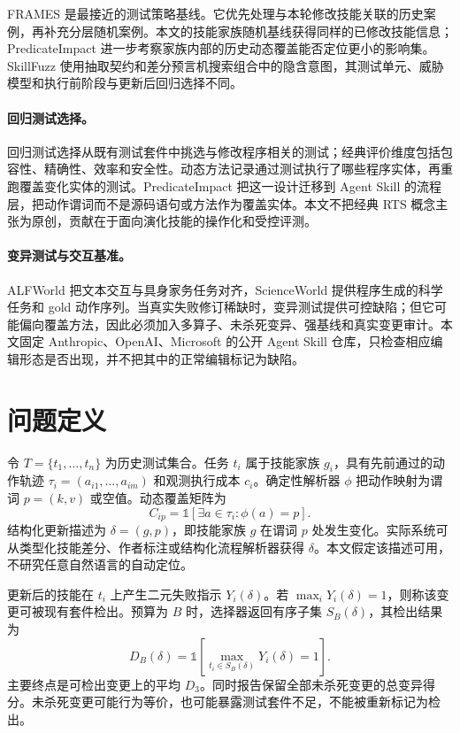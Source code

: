 \documentclass[10pt]{article}
\begin{document}
FRAMES 是最接近的测试策略基线。它优先处理与本轮修改技能关联的历史案例，再补充分层随机案例\citep{wang2026frames}。本文的技能家族随机基线获得同样的已修改技能信息；PredicateImpact 进一步考察家族内部的历史动态覆盖能否定位更小的影响集。SkillFuzz 使用抽取契约和差分预言机搜索组合中的隐含意图\citep{hu2026skillfuzz}，其测试单元、威胁模型和执行前阶段与更新后回归选择不同。

\paragraph{回归测试选择。}
回归测试选择从既有测试套件中挑选与修改程序相关的测试；经典评价维度包括包容性、精确性、效率和安全性\citep{rothermel1996rts}。动态方法记录通过测试执行了哪些程序实体，再重跑覆盖变化实体的测试。PredicateImpact 把这一设计迁移到 Agent Skill 的流程层，把动作谓词而不是源码语句或方法作为覆盖实体。本文不把经典 RTS 概念主张为原创，贡献在于面向演化技能的操作化和受控评测。

\paragraph{变异测试与交互基准。}
ALFWorld 把文本交互与具身家务任务对齐，ScienceWorld 提供程序生成的科学任务和 gold 动作序列\citep{shridhar2021alfworld,wang2022scienceworld}。当真实失败修订稀缺时，变异测试提供可控缺陷；但它可能偏向覆盖方法，因此必须加入多算子、未杀死变异、强基线和真实变更审计。本文固定 Anthropic、OpenAI、Microsoft 的公开 Agent Skill 仓库，只检查相应编辑形态是否出现\citep{anthropicskills2026,openaiskills2026,microsoftskills2026}，并不把其中的正常编辑标记为缺陷。

\section{问题定义}
令 $T=\{t_1,\ldots,t_n\}$ 为历史测试集合。任务 $t_i$ 属于技能家族 $g_i$，具有先前通过的动作轨迹 $\tau_i=(a_{i1},\ldots,a_{im})$ 和观测执行成本 $c_i$。确定性解析器 $\phi$ 把动作映射为谓词 $p=(k,v)$ 或空值。动态覆盖矩阵为
\begin{equation}
C_{ip}=\mathbb{1}\left[\exists a\in\tau_i:\phi(a)=p\right].
\end{equation}
结构化更新描述为 $\delta=(g,p)$，即技能家族 $g$ 在谓词 $p$ 处发生变化。实际系统可从类型化技能差分、作者标注或结构化流程解析器获得 $\delta$。本文假定该描述可用，不研究任意自然语言的自动定位。

更新后的技能在 $t_i$ 上产生二元失败指示 $Y_i(\delta)$。若 $\max_iY_i(\delta)=1$，则称该变更可被现有套件检出。预算为 $B$ 时，选择器返回有序子集 $S_B(\delta)$，其检出结果为
\begin{equation}
D_B(\delta)=\mathbb{1}\left[\max_{t_i\in S_B(\delta)}Y_i(\delta)=1\right].
\end{equation}
主要终点是可检出变更上的平均 $D_3$。同时报告保留全部未杀死变更的总变异得分。未杀死变更可能行为等价，也可能暴露测试套件不足，不能被重新标记为检出。
\end{document}
